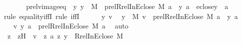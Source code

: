 \begin{isabellebody}
%
\isadelimproof
%
\endisadelimproof
%
\isatagproof
{}\isamarkupfalse%
\ {\isacharminus}{\kern0pt}\ \isanewline
\isanewline
\ \ \isamarkupfalse%
\ prelvimageeq\ {\isacharcolon}{\kern0pt}\ {\isachardoublequoteopen}{\isasymAnd}y{\isachardot}{\kern0pt}\ y\ {\isasymin}\ M\ {\isasymLongrightarrow}\ prel{\isacharparenleft}{\kern0pt}Rrel{\isacharparenleft}{\kern0pt}InEclose{\isacharcomma}{\kern0pt}\ M{\isacharparenright}{\kern0pt}{\isacharcomma}{\kern0pt}\ {\isacharbraceleft}{\kern0pt}a{\isacharbraceright}{\kern0pt}{\isacharparenright}{\kern0pt}\ {\isacharminus}{\kern0pt}{\isacharbackquote}{\kern0pt}{\isacharbackquote}{\kern0pt}\ {\isacharbraceleft}{\kern0pt}{\isasymlangle}y{\isacharcomma}{\kern0pt}\ a{\isasymrangle}{\isacharbraceright}{\kern0pt}\ {\isacharequal}{\kern0pt}\ eclose{\isacharparenleft}{\kern0pt}y{\isacharparenright}{\kern0pt}\ {\isasymtimes}\ {\isacharbraceleft}{\kern0pt}a{\isacharbraceright}{\kern0pt}{\isachardoublequoteclose}\ \isanewline
\ \ \isamarkupfalse%
{\isacharparenleft}{\kern0pt}rule\ equality{\isacharunderscore}{\kern0pt}iffI{\isacharcomma}{\kern0pt}\ rule\ iffI{\isacharparenright}{\kern0pt}\isanewline
\ \ \ \ \isamarkupfalse%
\ y\ v\ \isamarkupfalse%
\ {\isachardoublequoteopen}y\ {\isasymin}\ M{\isachardoublequoteclose}\ {\isachardoublequoteopen}v\ {\isasymin}\ prel{\isacharparenleft}{\kern0pt}Rrel{\isacharparenleft}{\kern0pt}InEclose{\isacharcomma}{\kern0pt}\ M{\isacharparenright}{\kern0pt}{\isacharcomma}{\kern0pt}\ {\isacharbraceleft}{\kern0pt}a{\isacharbraceright}{\kern0pt}{\isacharparenright}{\kern0pt}\ {\isacharminus}{\kern0pt}{\isacharbackquote}{\kern0pt}{\isacharbackquote}{\kern0pt}\ {\isacharbraceleft}{\kern0pt}{\isasymlangle}y{\isacharcomma}{\kern0pt}\ a{\isasymrangle}{\isacharbraceright}{\kern0pt}{\isachardoublequoteclose}\isanewline
\ \ \ \ \isamarkupfalse%
\ \isamarkupfalse%
\ {\isachardoublequoteopen}{\isacharless}{\kern0pt}v{\isacharcomma}{\kern0pt}\ {\isacharless}{\kern0pt}y{\isacharcomma}{\kern0pt}\ a{\isachargreater}{\kern0pt}{\isachargreater}{\kern0pt}\ {\isasymin}\ prel{\isacharparenleft}{\kern0pt}Rrel{\isacharparenleft}{\kern0pt}InEclose{\isacharcomma}{\kern0pt}\ M{\isacharparenright}{\kern0pt}{\isacharcomma}{\kern0pt}\ {\isacharbraceleft}{\kern0pt}a{\isacharbraceright}{\kern0pt}{\isacharparenright}{\kern0pt}{\isachardoublequoteclose}\ \isamarkupfalse%
\ auto\ \isanewline
\ \ \ \ \isamarkupfalse%
\ \isamarkupfalse%
\ z\ \ zH\ {\isacharcolon}{\kern0pt}\ {\isachardoublequoteopen}v\ {\isacharequal}{\kern0pt}\ {\isacharless}{\kern0pt}z{\isacharcomma}{\kern0pt}\ a{\isachargreater}{\kern0pt}{\isachardoublequoteclose}\ {\isachardoublequoteopen}{\isacharless}{\kern0pt}z{\isacharcomma}{\kern0pt}\ y{\isachargreater}{\kern0pt}\ {\isasymin}\ Rrel{\isacharparenleft}{\kern0pt}InEclose{\isacharcomma}{\kern0pt}\ M{\isacharparenright}{\kern0pt}{\isachardoublequoteclose}\ \isamarkupfalse%

\end{isabellebody}
